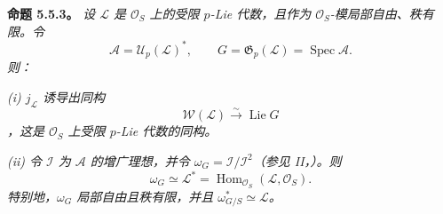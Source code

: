 \medskip
\noindent\textbf{命题 5.5.3。}
\label{sga3:VIIA:5.5.3}
\textit{设 \(\mathcal L\) 是 \(\mathcal O_S\) 上的受限 \(p\)-Lie 代数，且作为 \(\mathcal O_S\)-模局部自由、秩有限。令}
\[
  \mathcal A=\mathcal U_p(\mathcal L)^{*},
  \qquad
  G=\mathfrak G_p(\mathcal L)=\operatorname{Spec}\mathcal A.
\]
\textit{则：}

\smallskip
\noindent
\textit{(i) \(j_{\mathcal L}\) 诱导出同构}
\[
  \mathcal W(\mathcal L)
  \xrightarrow{\sim}
  \operatorname{Lie}G
\]
\textit{，这是 \(\mathcal O_S\) 上受限 \(p\)-Lie 代数的同构。}

\smallskip
\noindent
\textit{(ii) 令 \(\mathcal I\) 为 \(\mathcal A\) 的增广理想，并令 \(\omega_G=\mathcal I/\mathcal I^2\)（参见 II，）。则}
\[
  \omega_G
  \simeq
  \mathcal L^{*}
  =
  \operatorname{Hom}_{\mathcal O_S}
    (\mathcal L,\mathcal O_S).
\]
\textit{特别地，\(\omega_G\) 局部自由且秩有限，并且 \(\omega_{G/S}^{*}\simeq\mathcal L\)。}

